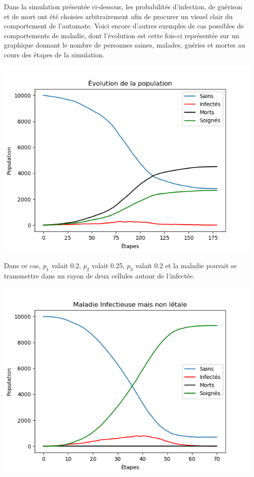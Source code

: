 \documentclass{article}
\begin{document}
Dans la simulation présentée ci-dessous, les probabilités d'infection, de guérison et de mort ont été choisies arbitrairement afin de procurer un visuel clair du comportement de l'automate. Voici encore d'autres exemples de cas possibles de comportements de maladie, dont l'évolution est cette fois-ci représentée sur un graphique donnant le nombre de personnes saines, malades, guéries et mortes au cours des étapes de la simulation.



\includegraphics[scale=1]{g.png} 


	Dans ce cas, $p_1$ valait 0.2, $p_2$ valait 0.25, $p_3$ valait 0.2 et la maladie pouvait se transmettre dans un rayon de deux cellules autour de l'infectée.

\includegraphics[scale=1]{Figure_2.png}
\end{document}
